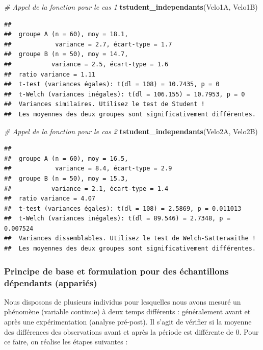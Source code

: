 \documentclass[
  11pt,
  french,
]{book}
\makeatletter
\newenvironment{Shaded}{\begin{snugshade}}{\end{snugshade}}
\newcommand{\CommentTok}[1]{\textcolor[rgb]{0.56,0.35,0.01}{\textit{#1}}}
\newcommand{\KeywordTok}[1]{\textcolor[rgb]{0.13,0.29,0.53}{\textbf{#1}}}
\newcommand{\NormalTok}[1]{#1}
\newenvironment{kframe}{%
\medskip{}
\setlength{\fboxsep}{.8em}
 \def\at@end@of@kframe{}%
 \ifinner\ifhmode%
  \def\at@end@of@kframe{\end{minipage}}%
  \begin{minipage}{\columnwidth}%
 \fi\fi%
 \def\FrameCommand##1{\hskip\@totalleftmargin \hskip-\fboxsep
 \colorbox{shadecolor}{##1}\hskip-\fboxsep
     \hskip-\linewidth \hskip-\@totalleftmargin \hskip\columnwidth}%
 \MakeFramed {\advance\hsize-\width
   \@totalleftmargin\z@ \linewidth\hsize
   \@setminipage}}%
 {\par\unskip\endMakeFramed%
 \at@end@of@kframe}
\renewenvironment{Shaded}{\begin{kframe}}{\end{kframe}}
\makeatother
\begin{document}
\begin{Shaded}
\begin{Highlighting}[]
\CommentTok{# Appel de la fonction pour le cas 1}
\KeywordTok{tstudent_independants}\NormalTok{(Velo1A, Velo1B)}
\end{Highlighting}
\end{Shaded}

\begin{verbatim}
## 
##  groupe A (n = 60), moy = 18.1, 
##            variance = 2.7, écart-type = 1.7
##  groupe B (n = 50), moy = 14.7, 
##           variance = 2.5, écart-type = 1.6
##  ratio variance = 1.11
##  t-test (variances égales): t(dl = 108) = 10.7435, p = 0
##  t-Welch (variances inégales): t(dl = 106.155) = 10.7953, p = 0
##  Variances similaires. Utilisez le test de Student !
##  Les moyennes des deux groupes sont significativement différentes.
\end{verbatim}

\begin{Shaded}
\begin{Highlighting}[]
\CommentTok{# Appel de la fonction pour le cas 2}
\KeywordTok{tstudent_independants}\NormalTok{(Velo2A, Velo2B)}
\end{Highlighting}
\end{Shaded}

\begin{verbatim}
## 
##  groupe A (n = 60), moy = 16.5, 
##            variance = 8.4, écart-type = 2.9
##  groupe B (n = 50), moy = 15.3, 
##           variance = 2.1, écart-type = 1.4
##  ratio variance = 4.07
##  t-test (variances égales): t(dl = 108) = 2.5869, p = 0.011013
##  t-Welch (variances inégales): t(dl = 89.546) = 2.7348, p = 0.007524
##  Variances dissemblables. Utilisez le test de Welch-Satterwaithe !
##  Les moyennes des deux groupes sont significativement différentes.
\end{verbatim}

\hypertarget{sect04311}{%
\subsubsection{Principe de base et formulation pour des échantillons dépendants (appariés)}\label{sect04311}}

Nous disposons de plusieurs individus pour lesquelles nous avons mesuré un phénomène (variable continue) à deux temps différents : généralement avant et après une expérimentation (analyse pré-post). Il s'agit de vérifier si la moyenne des différences des observations avant et après la période est différente de 0. Pour ce faire, on réalise les étapes suivantes :
\end{document}
